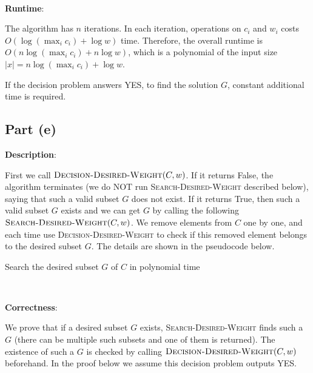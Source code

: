 \documentclass{article}
\begin{document}
~

\noindent\textbf{Runtime}:

The algorithm has $n$ iterations. In each iteration, operations on $c_i$ and $w_i$ costs $O(\log(\max_ic_i)+\log w)$ time. Therefore, the overall runtime is $O(n\log(\max_ic_i)+n\log w)$, which is a polynomial of the input size $|x|=n\log(\max_ic_i)+\log w$.

If the decision problem answers YES, to find the solution $G$, constant additional time is required.

\subsection{Part (e)}
\noindent\textbf{Description}:

First we call $\textsc{Decision-Desired-Weight}(C,w)$. If it returns False, the algorithm terminates (we do NOT run \textsc{Search-Desired-Weight} described below), saying that such a valid subset $G$ does not exist. If it returns True, then such a valid subset $G$ exists and we can get $G$ by calling the following $\textsc{Search-Desired-Weight}(C,w)$. We remove elements from $C$ one by one, and each time use \textsc{Decision-Desired-Weight} to check if this removed element belongs to the desired subset $G$. The details are shown in the pseudocode below.
\begin{algorithm}
\caption{Search the desired subset $G$ of $C$ in polynomial time}
\begin{algorithmic}[1]
\State{}
	\Else{}
	\EndIf
\EndIf
\State{}
\EndProcedure
\end{algorithmic}
\end{algorithm}

~

\noindent\textbf{Correctness}:

We prove that if a desired subset $G$ exists, \textsc{Search-Desired-Weight} finds such a $G$ (there can be multiple such subsets and one of them is returned). The existence of such a $G$ is checked by calling $\textsc{Decision-Desired-Weight}(C,w)$ beforehand. In the proof below we assume this decision problem outputs YES.
\end{document}
